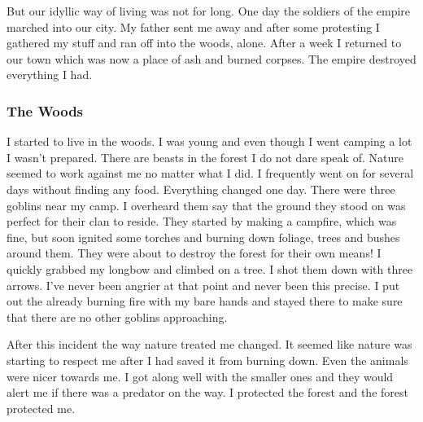 \documentclass[letterpaper,10pt,twoside,twocolumn,openany]{book}
\begin{document}
	But our idyllic way of living was not for long. One day the soldiers of the empire marched into our city. My father sent me away and after some protesting I gathered my stuff and ran off into the woods, alone. After a week I returned to our town which was now a place of ash and burned corpses. The empire destroyed everything I had. 
	
	\subsubsection{The Woods}
	I started to live in the woods. I was young and even though I went camping a lot I wasn’t prepared. There are beasts in the forest I do not dare speak of. Nature seemed to work against me no matter what I did. I frequently went on for several days without finding any food. Everything changed one day. There were three goblins near my camp. I overheard them say that the ground they stood on was perfect for their clan to reside. They started by making a campfire, which was fine, but soon ignited some torches and burning down foliage, trees and bushes around them. They were about to destroy the forest for their own means! I quickly grabbed my longbow and climbed on a tree. I shot them down with three arrows. I’ve never been angrier at that point and never been this precise. I put out the already burning fire with my bare hands and stayed there to make sure that there are no other goblins approaching.
	
	After this incident the way nature treated me changed. It seemed like nature was starting to respect me after I had saved it from burning down. Even the animals were nicer towards me. I got along well with the smaller ones and they would alert me if there was a predator on the way. I protected the forest and the forest protected me. 
	
\end{document}
